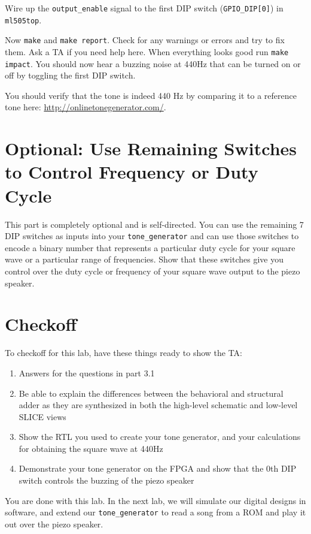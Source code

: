 \documentclass[11pt]{article}
\begin{document}
Wire up the \verb|output_enable| signal to the first DIP switch (\verb|GPIO_DIP[0]|) in \verb|ml505top|.

Now \verb|make| and \verb|make report|. Check for any warnings or errors and try to fix them. Ask a TA if you need help here. When everything looks good run \verb|make impact|. You should now hear a buzzing noise at 440Hz that can be turned on or off by toggling the first DIP switch.

You should verify that the tone is indeed 440 Hz by comparing it to a reference tone here: \url{http://onlinetonegenerator.com/}.

\section{Optional: Use Remaining Switches to Control Frequency or Duty Cycle}
This part is completely optional and is self-directed. You can use the remaining 7 DIP switches as inputs into your \verb|tone_generator| and can use those switches to encode a binary number that represents a particular duty cycle for your square wave or a particular range of frequencies. Show that these switches give you control over the duty cycle or frequency of your square wave output to the piezo speaker.

\section{Checkoff}
To checkoff for this lab, have these things ready to show the TA:

\begin{enumerate}
	\item Answers for the questions in part 3.1
	\item Be able to explain the differences between the behavioral and structural adder as they are synthesized in both the high-level schematic and low-level SLICE views
	\item Show the RTL you used to create your tone generator, and your calculations for obtaining the square wave at 440Hz
	\item Demonstrate your tone generator on the FPGA and show that the 0th DIP switch controls the buzzing of the piezo speaker
\end{enumerate}

You are done with this lab. In the next lab, we will simulate our digital designs in software, and extend our \verb|tone_generator| to read a song from a ROM and play it out over the piezo speaker.
\end{document}
